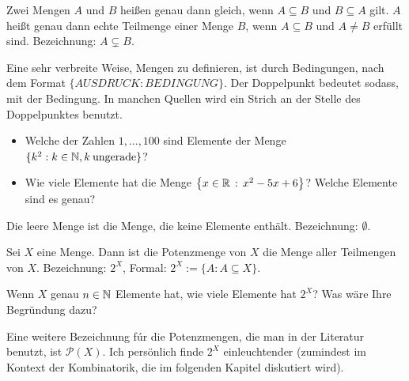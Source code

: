\begin{defn}
Zwei Mengen $ A $ und $ B $ heißen genau dann gleich, wenn $ A \subseteq B $ und $ B \subseteq A $ gilt. $ A $ heißt genau dann echte Teilmenge einer Menge $ B $, wenn $ A \subseteq B $ und $ A \neq B $ erfüllt sind. Bezeichnung: $ A \varsubsetneq B $.
\end{defn} 


\begin{bem}
Eine sehr verbreite Weise, Mengen zu definieren, ist durch Bedingungen, nach dem Format 
$ \{ AUSDRUCK : BEDINGUNG \} $. Der Doppelpunkt bedeutet \glqq sodass\grqq, \glqq mit der Bedingung\grqq. In manchen Quellen wird ein Strich an der Stelle des Doppelpunktes benutzt. 
\end{bem} 

\begin{aufg}
\begin{itemize}
\item Welche der Zahlen $1,\ldots, 100$ sind Elemente der Menge $ \{ k^2 : k \in \mathbb{N}, k \: \text{ungerade} \} $?  
\item Wie viele Elemente hat die Menge $\left\{ x \in \mathbb{R} \,:\, x^2- 5 x + 6 \right\} $? Welche Elemente sind es genau? 
\end{itemize}
\end{aufg}

\begin{defn}
Die leere Menge ist die Menge, die keine Elemente enthält. Bezeichnung: $ \emptyset $.
\end{defn} 

\begin{defn}[Potenzmenge]
Sei $ X $ eine Menge. Dann ist die Potenzmenge von $ X $ die Menge aller Teilmengen von $ X $. Bezeichnung: $ 2^X $, Formal: $ 2^X := \{ A : A \subseteq X \} $.
\end{defn} 

\begin{aufg}
	Wenn $X$ genau $n \in \mathbb{N}$ Elemente hat, wie viele Elemente hat $2^X$? Was wäre Ihre Begründung dazu? 
\end{aufg} 

\begin{bem}
	Eine weitere Bezeichnung fúr die Potenzmengen, die man in der Literatur benutzt, ist $\mathcal{P}(X)$. Ich persönlich finde $2^X$ einleuchtender (zumindest im Kontext der Kombinatorik, die im folgenden Kapitel diskutiert wird). 
\end{bem} 


